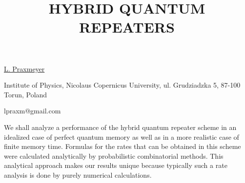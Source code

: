 \title{HYBRID QUANTUM REPEATERS}

\underline{L. Praxmeyer}

{\normalsize{
\vspace{-4mm} 
Institute of Physics, Nicolaus Copernicus University, ul. Grudziadzka 5, 87-100 Torun, Poland 

\email lpraxm@gmail.com}}

We shall analyze a performance of the hybrid quantum repeater
scheme in an idealized case of perfect quantum memory
as well as in a more realistic case of finite memory time.
Formulas for the rates that can be obtained in this scheme were
calculated analytically by probabilistic combinatorial
methods. This analytical approach makes our results unique because
typically such a rate analysis is done by purely numerical calculations.

\vspace{\baselineskip} 
